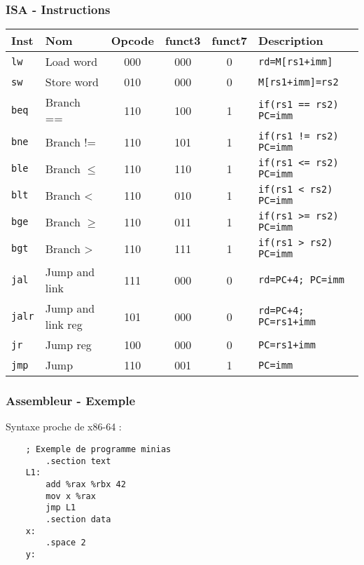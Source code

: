 \documentclass[xcolor=pst,10pt,onlymath]{beamer}
\begin{document}
\begin{frame}
    \frametitle{ISA - Instructions}
    \begin{longtable}{|l|l|c|c|c|l|}
        \hline
        Inst           & Nom                             & Opcode & funct3 & funct7 & Description                   \\
        \hline
        \texttt{lw}    & Load word                       & 000    & 000    & 0      & \texttt{rd=M[rs1+imm]}        \\
        \texttt{sw}    & Store word                      & 010    & 000    & 0      & \texttt{M[rs1+imm]=rs2}       \\
        \hline
        \texttt{beq}   & Branch ==                       & 110    & 100    & 1      & \texttt{if(rs1 == rs2) PC=imm}\\
        \texttt{bne}   & Branch !=                       & 110    & 101    & 1      & \texttt{if(rs1 != rs2) PC=imm}\\
        \texttt{ble}   & Branch \(\leqslant\)            & 110    & 110    & 1      & \texttt{if(rs1 <= rs2) PC=imm}\\
        \texttt{blt}   & Branch <                        & 110    & 010    & 1      & \texttt{if(rs1 < rs2) PC=imm} \\
        \texttt{bge}   & Branch \(\geqslant\)            & 110    & 011    & 1      & \texttt{if(rs1 >= rs2) PC=imm}\\
        \texttt{bgt}   & Branch >                        & 110    & 111    & 1      & \texttt{if(rs1 > rs2) PC=imm} \\
        \hline
        \texttt{jal}   & Jump and link                   & 111    & 000    & 0      &\texttt{rd=PC+4; PC=imm}       \\
        \texttt{jalr}  & Jump and link reg               & 101    & 000    & 0      &\texttt{rd=PC+4; PC=rs1+imm}   \\
        \texttt{jr}    & Jump reg                        & 100    & 000    & 0      &\texttt{PC=rs1+imm}            \\
        \texttt{jmp}   & Jump                            & 110    & 001    & 1      &\texttt{PC=imm}                \\
        \hline
    \end{longtable}
\end{frame}


\Large
\begin{frame}[fragile]
    \frametitle{Assembleur - Exemple}
    Syntaxe proche de x86-64 :
    \begin{center}
    \begin{lstlisting}
    ; Exemple de programme minias
        .section text
    L1:
        add %rax %rbx 42
        mov x %rax
        jmp L1
        .section data
    x:  
        .space 2
    y:
    \end{lstlisting}
    \end{center}
\end{frame}
\end{document}

